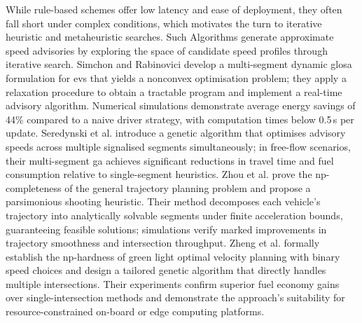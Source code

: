 \mynewline
While rule-based schemes offer low latency and ease of deployment, they often fall short under complex conditions, which motivates the turn to iterative heuristic and metaheuristic searches. Such Algorithms generate approximate speed advisories by exploring the space of candidate speed profiles through iterative search. Simchon and Rabinovici \cite{RealTimeGLOSA2020} develop a multi-segment dynamic \ac{glosa} formulation for \acp{ev} that yields a nonconvex optimisation problem; they apply a relaxation procedure to obtain a tractable program and implement a real-time advisory algorithm. Numerical simulations demonstrate average energy savings of 44\% compared to a naive driver strategy, with computation times below 0.5\,s per update. Seredynski et al. \cite{Seredynski2013} introduce a genetic algorithm that optimises advisory speeds across multiple signalised segments simultaneously; in free-flow scenarios, their multi-segment \ac{ga} achieves significant reductions in travel time and fuel consumption relative to single-segment heuristics. Zhou et al. \cite{Zhou2015} prove the \ac{np}-completeness of the general trajectory planning problem and propose a parsimonious shooting heuristic. Their method decomposes each vehicle’s trajectory into analytically solvable segments under finite acceleration bounds, guaranteeing feasible solutions; simulations verify marked improvements in trajectory smoothness and intersection throughput. Zheng et al. \cite{Zheng2015} formally establish the \ac{np}-hardness of green light optimal velocity planning with binary speed choices and design a tailored genetic algorithm that directly handles multiple intersections. Their experiments confirm superior fuel economy gains over single-intersection methods and demonstrate the approach’s suitability for resource-constrained on-board or edge computing platforms. 
\mynewline

